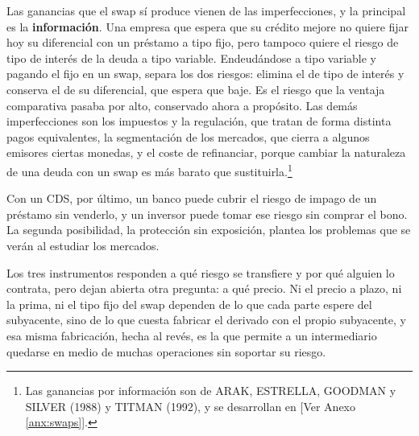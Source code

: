 \documentclass[10pt,a4paper]{article}
\newcommand{\authorfont}[1]{{\fontfamily{EBGaramond-TLF}\selectfont #1}}
\begin{document}
Las ganancias que el swap sí produce vienen de las imperfecciones, y la principal es la \textbf{información}. Una empresa que espera que su crédito mejore no quiere fijar hoy su diferencial con un préstamo a tipo fijo, pero tampoco quiere el riesgo de tipo de interés de la deuda a tipo variable. Endeudándose a tipo variable y pagando el fijo en un swap, separa los dos riesgos: elimina el de tipo de interés y conserva el de su diferencial, que espera que baje. Es el riesgo que la ventaja comparativa pasaba por alto, conservado ahora a propósito. Las demás imperfecciones son los impuestos y la regulación, que tratan de forma distinta pagos equivalentes, la segmentación de los mercados, que cierra a algunos emisores ciertas monedas, y el coste de refinanciar, porque cambiar la naturaleza de una deuda con un swap es más barato que sustituirla.\footnote{%
    Las ganancias por información son de ARAK, ESTRELLA, GOODMAN y SILVER (1988) y TITMAN (1992), y se desarrollan en [\authorfont{Ver Anexo \ref{anx:swaps}}].
}

Con un CDS, por último, un banco puede cubrir el riesgo de impago de un préstamo sin venderlo, y un inversor puede tomar ese riesgo sin comprar el bono. La segunda posibilidad, la protección sin exposición, plantea los problemas que se verán al estudiar los mercados.

Los tres instrumentos responden a qué riesgo se transfiere y por qué alguien lo contrata, pero dejan abierta otra pregunta: a qué precio. Ni el precio a plazo, ni la prima, ni el tipo fijo del swap dependen de lo que cada parte espere del subyacente, sino de lo que cuesta fabricar el derivado con el propio subyacente, y esa misma fabricación, hecha al revés, es la que permite a un intermediario quedarse en medio de muchas operaciones sin soportar su riesgo.






\clearpage
\end{document}
